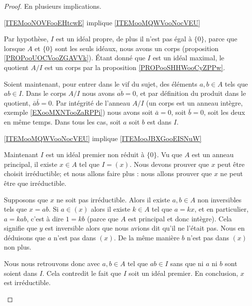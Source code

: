 \begin{proof}
    En plusieurs implications.
    \begin{subproof}
        \item[\ref{ITEMooNOVFooEHtcwE} implique \ref{ITEMooMQWVooNocVEU}]

            Par hypothèse, \( I\) est un idéal propre, de plus il n'est pas égal à \( \{ 0 \}\), parce que lorsque \( A\) et \( \{ 0 \} \) sont les seuls idéaux, nous avons un corps (proposition \ref{PROPooUOCVooZGAVVk}). Étant donné que \( I\) est un idéal maximal, le quotient \( A/I\) est un corps par la proposition \ref{PROPooSHHWooCyZPPw}.

            Soient maintenant, pour entrer dans le vif du sujet, des éléments \( a,b\in A\) tels que \( ab\in I\). Dans le corps \( A/I\) nous avons \( \overline{ ab }=0\), et par définition du produit dans le quotient, \( \bar a\bar b=0\). Par intégrité de l'anneau \( A/I\) (un corps est un anneau intègre, exemple \ref{EXooMXNTooZaRPPi}) nous avons soit \( \bar a=0\), soit \( \bar b=0\), soit les deux en même temps. Dans tous les cas, soit \( a\) soit \( b\) est dans \( I\).

        \item[\ref{ITEMooMQWVooNocVEU} implique \ref{ITEMooJBXGooEISNuW}]

            Maintenant \( I\) est un idéal premier non réduit à \( \{ 0 \}\). Vu que \( A\) est un anneau principal, il existe \( x\in A\) tel que \( I=(x)\). Nous devons prouver que \( x\) peut être choisit irréductible; et nous allons faire plus : nous allons prouver que \( x\) ne peut être que irréductible.

            Supposons que \( x\) ne soit pas irréductible. Alors il existe \( a,b\in A\) non inversibles tels que \( x=ab\). Si \( a\in (x)\) alors il existe \( k\in A\) tel que \( a=kx\), et en particulier, \( a=kab\), c'est à dire \( 1=kb\) (parce que \( A\) est principal et donc intègre). Cela signifie que \( y\) est inversible alors que nous avions dit qu'il ne l'était pas. Nous en déduisons que \( a\) n'est pas dans \( (x)\). De la même manière \( b\) n'est pas dans \( (x)\) non plus.

            Nous nous retrouvons donc avec \( a,b\in A\) tel que \( ab\in I\) sans que ni \( a\) ni \( b\) sont soient dans \( I\). Cela contredit le fait que \( I\) soit un idéal premier. En conclusion, \( x\) est irréductible.


\end{subproof}
\end{proof}
